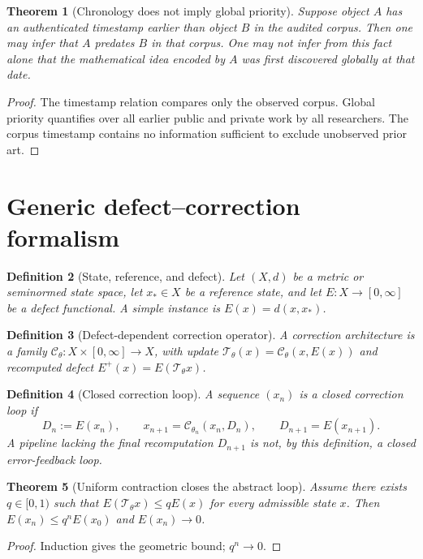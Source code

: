\documentclass[11pt]{article}
\newtheorem{theorem}{Theorem}[section]
\newtheorem{definition}[theorem]{Definition}
\begin{document}
\begin{theorem}[Chronology does not imply global priority]
Suppose object $A$ has an authenticated timestamp earlier than object $B$ in the audited corpus. Then one may infer that $A$ predates $B$ in that corpus. One may not infer from this fact alone that the mathematical idea encoded by $A$ was first discovered globally at that date.
\end{theorem}
\begin{proof}The timestamp relation compares only the observed corpus. Global priority quantifies over all earlier public and private work by all researchers. The corpus timestamp contains no information sufficient to exclude unobserved prior art.\end{proof}

\section{Generic defect--correction formalism}
\begin{definition}[State, reference, and defect]
Let $(X,d)$ be a metric or seminormed state space, let $x_*\in X$ be a reference state, and let $E:X\to[0,\infty]$ be a defect functional. A simple instance is $E(x)=d(x,x_*)$.
\end{definition}

\begin{definition}[Defect-dependent correction operator]
A correction architecture is a family $\mathcal C_\theta:X\times[0,\infty]\to X$, with update $\mathcal T_\theta(x)=\mathcal C_\theta(x,E(x))$ and recomputed defect $E^+(x)=E(\mathcal T_\theta x)$.
\end{definition}

\begin{definition}[Closed correction loop]
A sequence $(x_n)$ is a closed correction loop if
\[
D_n:=E(x_n),\qquad x_{n+1}=\mathcal C_{\theta_n}(x_n,D_n),\qquad D_{n+1}=E(x_{n+1}).
\]
A pipeline lacking the final recomputation $D_{n+1}$ is not, by this definition, a closed error-feedback loop.
\end{definition}

\begin{theorem}[Uniform contraction closes the abstract loop]
Assume there exists $q\in[0,1)$ such that $E(\mathcal T_\theta x)\le qE(x)$ for every admissible state $x$. Then $E(x_n)\le q^nE(x_0)$ and $E(x_n)\to0$.
\end{theorem}
\begin{proof}Induction gives the geometric bound; $q^n\to0$.\end{proof}
\end{document}
